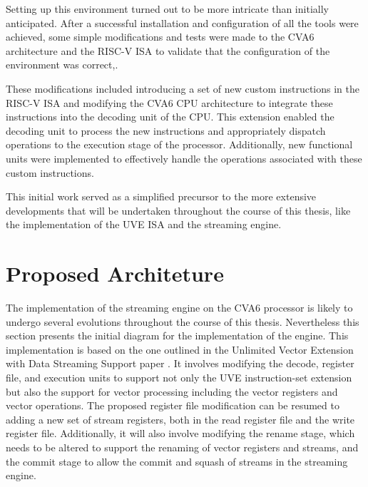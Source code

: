 Setting up this environment turned out to be more intricate than initially anticipated. After a successful installation and configuration of all the tools were achieved, some simple modifications and tests were made to the CVA6 architecture and the RISC-V \acrshort{ISA} to validate that the configuration of the environment was correct,.

These modifications included introducing a set of new custom instructions in the RISC-V ISA and modifying the CVA6 CPU architecture to integrate these instructions into the decoding unit of the CPU. This extension enabled the decoding unit to process the new instructions and appropriately dispatch operations to the execution stage of the processor. Additionally, new functional units were implemented to effectively handle the operations associated with these custom instructions.

This initial work served as a simplified precursor to the more extensive developments that will be undertaken throughout the course of this thesis, like the implementation of the UVE ISA and the streaming engine.

\section{Proposed Architeture}

The implementation of the streaming engine on the CVA6 processor is likely to undergo several evolutions throughout the course of this thesis. Nevertheless this section presents the initial diagram for the implementation of the engine. This implementation is based on the one outlined in the Unlimited Vector Extension with Data Streaming Support paper \cite{uve-paper}. 
It involves modifying the decode, register file, and execution units to support not only the UVE instruction-set extension but also the support for vector processing including the vector registers and vector operations. The proposed register file modification can be resumed to adding a new set of stream registers, both in the read register file and the write register file. Additionally, it will also involve modifying the rename stage, which needs to be altered to support the renaming of vector registers and streams, and the commit stage to allow the commit and squash of streams in the streaming engine.

